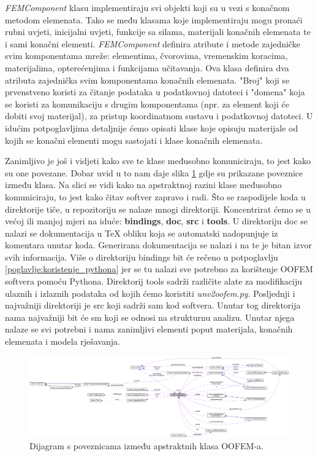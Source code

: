 \documentclass[a4paper,twoside,12pt]{memoir} %
\begin{document}
\textit{FEMComponent} klasu implementiraju svi objekti koji su u vezi s konačnom metodom elemenata. Tako se među klasama koje implementiraju mogu pronaći rubni uvjeti, inicijalni uvjeti, funkcije sa silama, materijali konačnih elemenata te i sami konačni elementi. \textit{FEMComponent} definira atribute i metode zajedničke svim komponentama mreže: elementima, čvorovima, vremenskim koracima, materijalima, opterećenjima i funkcijama učitavanja. Ova klasa definira dva atributa zajednička svim komponentama konačnih elemenata. "Broj" koji se prvenstveno koristi za čitanje podataka u podatkovnoj datoteci i "domena" koja se koristi za komunikaciju s drugim komponentama (npr. za element koji će dobiti svoj materijal), za pristup koordinatnom sustavu i podatkovnoj datoteci. U idućim potpoglavljima detaljnije ćemo opisati klase koje opisuju materijale od kojih se konačni elementi mogu sastojati i klase konačnih elemenata. \par

Zanimljivo je još i vidjeti kako sve te klase međusobno komuniciraju, to jest kako su one povezane. Dobar uvid u to nam daje slika \ref{fig:EngngModel_connections} gdje su prikazane poveznice između klasa. Na slici se vidi kako na apstraktnoj razini klase međusobno komuniciraju, to jest kako čitav softver zapravo i radi. Što se raspodijele koda u direktorije tiče, u repozitoriju \cite{oofem_github} se nalaze mnogi direktoriji. Koncentrirat ćemo se u većoj ili manjoj mjeri na iduće: \textbf{bindings}, \textbf{doc}, \textbf{src} i \textbf{tools}. U direktoriju doc se nalazi se dokumentacija u TeX obliku koja se automatski nadopunjuje iz komentara unutar koda. Generirana dokumentacija se nalazi i na \cite{oofem-web} te je bitan izvor svih informacija. Više o direktoriju bindings bit će rečeno u potpoglavlju \ref{poglavlje:koristenje_pythona} jer se tu nalazi sve potrebno za korištenje OOFEM softvera pomoću Pythona. Direktorij tools sadrži različite alate za modifikaciju ulaznih i izlaznih podataka od kojih ćemo koristiti \textit{unv2oofem.py}. Posljednji i najvažniji direktoriji je src koji sadrži sam kod softvera. Unutar tog direktorija nama najvažniji bit će sm koji se odnosi na strukturnu analizu. Unutar njega nalaze se svi potrebni i nama zanimljivi elementi poput materijala, konačnih elemenata i modela rješavanja.

\begin{figure}[h!t]
\begin{center}
\includegraphics[scale=0.2, angle=90]{pictures/chapter_oofem/EngngModel_connections.png}
\caption{Dijagram s poveznicama između apstraktnih klasa OOFEM-a. \cite{oofem_reference}}
\label{fig:EngngModel_connections}
\end{center}
\end{figure}
\end{document}
